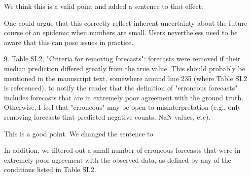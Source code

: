 \documentclass{article}
\newcommand{\black}{\color{black}}
\newcommand{\blue}{\color{blue}}
\begin{document}
\black
We think this is a valid point and added a sentence to that effect: 

One could argue that this correctly reflect inherent uncertainty about the future course of an epidemic when numbers are small. Users nevertheless need to be aware that this can pose issues in practice. 

\blue

9. Table SI.2, "Criteria for removing forecasts": forecasts were removed if their median prediction differed greatly from the true value. This should probably be mentioned in the manuscript text, somewhere around line 235 (where Table SI.2 is referenced), to notify the reader that the definition of "erroneous forecasts" includes forecasts that are in extremely poor agreement with the ground truth. Otherwise, I feel that "erroneous" may be open to misinterpretation (e.g., only removing forecasts that predicted negative counts, NaN values, etc).

\black
This is a good point. We changed the sentence to 

In addition, we filtered out a small number of erroneous forecasts that were in extremely poor agreement with the observed data, as defined by any of the conditions listed in Table SI.2. 







\clearpage

\end{document}
